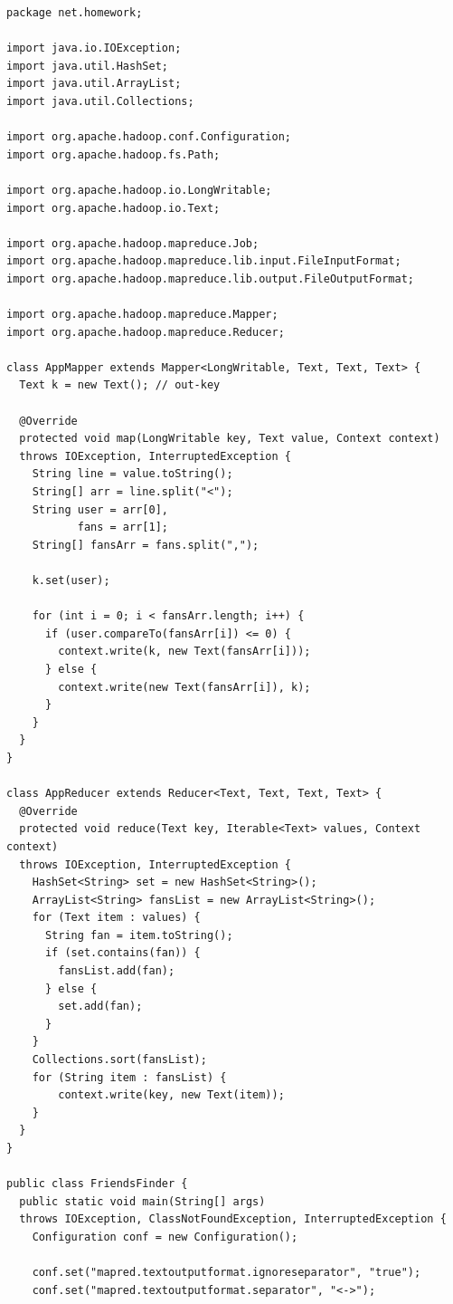 \documentclass{article}
\begin{document}
    \begin{center}
\begin{verbatim}
package net.homework;

import java.io.IOException;
import java.util.HashSet;
import java.util.ArrayList;
import java.util.Collections;

import org.apache.hadoop.conf.Configuration;
import org.apache.hadoop.fs.Path;

import org.apache.hadoop.io.LongWritable;
import org.apache.hadoop.io.Text;

import org.apache.hadoop.mapreduce.Job;
import org.apache.hadoop.mapreduce.lib.input.FileInputFormat;
import org.apache.hadoop.mapreduce.lib.output.FileOutputFormat;

import org.apache.hadoop.mapreduce.Mapper;
import org.apache.hadoop.mapreduce.Reducer;

class AppMapper extends Mapper<LongWritable, Text, Text, Text> {
  Text k = new Text(); // out-key

  @Override
  protected void map(LongWritable key, Text value, Context context)
  throws IOException, InterruptedException {
    String line = value.toString();
    String[] arr = line.split("<");
    String user = arr[0],
           fans = arr[1];
    String[] fansArr = fans.split(",");

    k.set(user);

    for (int i = 0; i < fansArr.length; i++) {
      if (user.compareTo(fansArr[i]) <= 0) {
        context.write(k, new Text(fansArr[i]));
      } else {
        context.write(new Text(fansArr[i]), k);
      }
    }
  }
}

class AppReducer extends Reducer<Text, Text, Text, Text> {
  @Override
  protected void reduce(Text key, Iterable<Text> values, Context context)
  throws IOException, InterruptedException {
    HashSet<String> set = new HashSet<String>();
    ArrayList<String> fansList = new ArrayList<String>();
    for (Text item : values) {
      String fan = item.toString();
      if (set.contains(fan)) {
        fansList.add(fan);
      } else {
        set.add(fan);
      }
    }
    Collections.sort(fansList);
    for (String item : fansList) {
        context.write(key, new Text(item));
    }
  }
}

public class FriendsFinder {
  public static void main(String[] args)
  throws IOException, ClassNotFoundException, InterruptedException {
    Configuration conf = new Configuration();

    conf.set("mapred.textoutputformat.ignoreseparator", "true");
    conf.set("mapred.textoutputformat.separator", "<->");


\end{verbatim}
\end{center}
\end{document}
